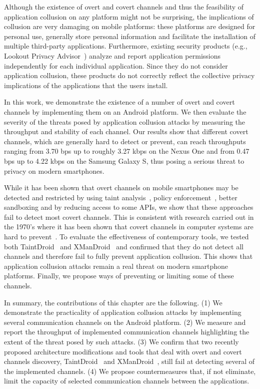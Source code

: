 Although the existence of overt and covert channels and thus the
feasibility of application collusion on any platform might not be
surprising, the implications of collusion are very damaging on mobile
platforms: these platforms are designed for personal use, generally
store personal information and facilitate the installation of multiple
third-party applications. Furthermore, existing security products
(e.g., Lookout Privacy Advisor~\cite{lookout_privacy_advisor}) analyze
and report application permissions independently for each individual
application. Since they do not consider application collusion, these
products do not correctly reflect the collective privacy implications
of the applications that the users install.

In this work, we demonstrate the existence of a number of overt and
covert channels by implementing them on an Android platform. We then
evaluate the severity of the threats posed by application collusion
attacks by measuring the throughput and stability of each channel. Our
results show that different covert channels, which are generally hard
to detect or prevent, can reach throughputs ranging from 3.70 bps up to
roughly 3.27 kbps on the Nexus One and from 0.47 bps up to 4.22 kbps
on the Samsung Galaxy S, thus posing a serious threat to privacy on
modern smartphones.

While it has been shown that overt channels on mobile smartphones may
be detected and restricted by using taint analysis~\cite{taintdroid},
policy enforcement~\cite{TUD-CS-2011-0127,newxmandroid}, better
sandboxing and by reducing access to some APIs, we show that these
approaches fail to detect most covert channels. This is consistent
with research carried out in the 1970's where it has been shown that
covert channels in computer systems are hard to
prevent~\cite{Denning:1979:DS:356778.356782,Lipner:comment_on_confinment}. To
evaluate the effectiveness of contemporary tools, we tested both
TaintDroid~\cite{taintdroid} and XManDroid~\cite{newxmandroid} and
confirmed that they do not detect all channels and therefore fail to
fully prevent application collusion. This shows that application
collusion attacks remain a real threat on modern smartphone
platforms. Finally, we propose ways of preventing or limiting some of
these channels.

In summary, the contributions of this chapter are the following. (1) We
demonstrate the practicality of application collusion attacks by
implementing several communication channels on the Android
platform. (2) We measure and report the throughput of implemented
communication channels highlighting the extent of the threat posed by
such attacks. (3) We confirm that two recently proposed architecture
modifications and tools that deal with overt and covert channels
discovery, TaintDroid~\cite{taintdroid} and
XManDroid~\cite{newxmandroid}, still fail at detecting several of the
implemented channels. (4) We propose countermeasures that, if not
eliminate, limit the capacity of selected communication channels
between the applications.

